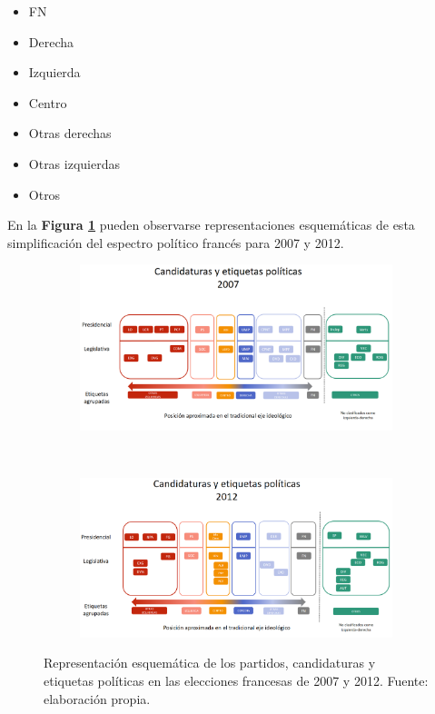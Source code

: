 \begin{itemize}
\item FN
\item Derecha
\item Izquierda
\item Centro
\item Otras derechas
\item Otras izquierdas
\item Otros
\end{itemize}

En la \textbf{Figura \ref{fig:Partidos_07_12}} pueden observarse representaciones esquemáticas de esta simplificación del espectro político francés para 2007 y 2012.\\

\begin{figure}[h]
	\centering
	\begin{subfigure}{0.9\textwidth}
	\includegraphics[width = \textwidth]{Figs/FN_Francia/Partidos_07}
	\end{subfigure}	
	~
	\begin{subfigure}{0.9\textwidth}
	\includegraphics[width = \textwidth]{Figs/FN_Francia/Partidos_12}
	\end{subfigure}		
	\caption{Representación esquemática de los partidos, candidaturas y etiquetas políticas en las elecciones francesas de 2007 y 2012. Fuente: elaboración propia.}
	\label{fig:Partidos_07_12}	
\end{figure}

